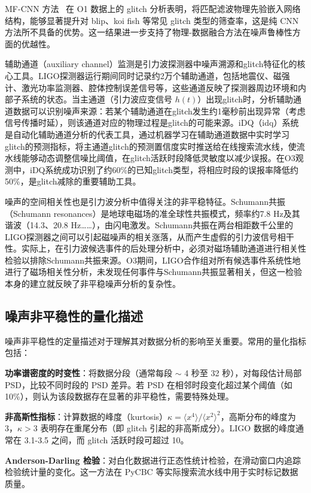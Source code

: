MF-CNN 方法~\cite{wang2020deeplearning} 在 O1 数据上的 glitch 分析表明，将匹配滤波物理先验嵌入网络结构，能够显著提升对 blip、koi fish 等常见 glitch 类型的筛查率，这是纯 CNN 方法所不具备的优势。这一结果进一步支持了物理-数据融合方法在噪声鲁棒性方面的优越性。

辅助通道（auxiliary channel）监测是引力波探测器中噪声溯源和glitch特征化的核心工具。LIGO探测器运行期间同时记录约2万个辅助通道，包括地震仪、磁强计、激光功率监测器、腔体控制误差信号等，这些通道反映了探测器周边环境和内部子系统的状态。当主通道（引力波应变信号 $h(t)$）出现glitch时，分析辅助通道数据可以识别噪声来源：若某个辅助通道在glitch发生约1毫秒前出现异常（考虑信号传播时延），则该通道对应的物理过程是glitch的可能来源。iDQ（idq）系统是自动化辅助通道分析的代表工具，通过机器学习在辅助通道数据中实时学习glitch的预测指标，将主通道glitch的预测置信度实时推送给在线搜索流水线，使流水线能够动态调整信噪比阈值，在glitch活跃时段降低灵敏度以减少误报。在O3观测中，iDQ系统成功识别了约60\%的已知glitch类型，将相应时段的误报率降低约50\%，是glitch减除的重要辅助工具。

噪声的空间相关性也是引力波分析中值得关注的非平稳特征。Schumann共振（Schumann resonances）是地球电磁场的准全球性共振模式，频率约7.8 Hz及其谐波（14.3、20.8 Hz……），由闪电激发。Schumann共振在两台相距数千公里的LIGO探测器之间可以引起磁噪声的相关涨落，从而产生虚假的引力波信号相干性。实际上，在引力波候选事件的后处理分析中，必须对磁场辅助通道进行相关性检验以排除Schumann共振来源。O3期间，LIGO合作组对所有候选事件系统性地进行了磁场相关性分析，未发现任何事件与Schumann共振显著相关，但这一检验本身的建立就反映了非平稳噪声分析的复杂性。

\subsection{噪声非平稳性的量化描述}

噪声非平稳性的定量描述对于理解其对数据分析的影响至关重要。常用的量化指标包括：

\textbf{功率谱密度的时变性}：将数据分段（通常每段 $\sim$ 4 秒至 32 秒），对每段估计局部 PSD，比较不同时段的 PSD 差异。若 PSD 在相邻时段变化超过某个阈值（如 10\%），则认为该段数据存在显著的非平稳性，需要特殊处理。

\textbf{非高斯性指标}：计算数据的峰度（kurtosis）$\kappa = \langle x^4 \rangle / \langle x^2 \rangle^2$，高斯分布的峰度为3，$\kappa > 3$ 表明存在重尾分布（即 glitch 引起的非高斯成分）。LIGO 数据的峰度通常在 3.1-3.5 之间，而 glitch 活跃时段可超过 10。

\textbf{Anderson-Darling 检验}：对白化数据进行正态性统计检验，在滑动窗口内追踪检验统计量的变化。这一方法在 PyCBC 等实际搜索流水线中用于实时标记数据质量。

